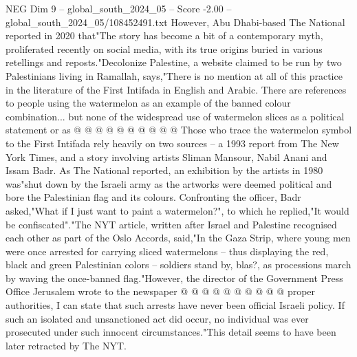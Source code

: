 \begin{textsample}{NEG Dim 9 – global\_south\_2024\_05 – Score -2.00 – global\_south\_2024\_05/108452491.txt}
However, Abu Dhabi-based The National reported in 2020 that"The story has become a bit of a contemporary myth, proliferated recently on social media, with its true origins buried in various retellings and reposts."Decolonize Palestine, a website claimed to be run by two Palestinians living in Ramallah, says,"There is no mention at all of this practice in the literature of the First Intifada in English and Arabic.
There are references to people using the watermelon as an example of the banned colour combination... but none of the widespread use of watermelon slices as a political statement or as @ @ @ @ @ @ @ @ @ @ Those who trace the watermelon symbol to the First Intifada rely heavily on two sources -- a 1993 report from The New York Times, and a story involving artists Sliman Mansour, Nabil Anani and Issam Badr.
As The National reported, an exhibition by the artists in 1980 was"shut down by the Israeli army as the artworks were deemed political and bore the Palestinian flag and its colours.
Confronting the officer, Badr asked,"What if I just want to paint a watermelon?", to which he replied,"It would be confiscated"."The NYT article, written after Israel and Palestine recognised each other as part of the Oslo Accords, said,"In the Gaza Strip, where young men were once arrested for carrying sliced watermelons -- thus displaying the red, black and green Palestinian colors -- soldiers stand by, blas?, as processions march by waving the once-banned flag."However, the director of the Government Press Office Jerusalem wrote to the newspaper @ @ @ @ @ @ @ @ @ @ proper authorities, I can state that such arrests have never been official Israeli policy.
If such an isolated and unsanctioned act did occur, no individual was ever prosecuted under such innocent circumstances."This detail seems to have been later retracted by The NYT.

\end{textsample}
